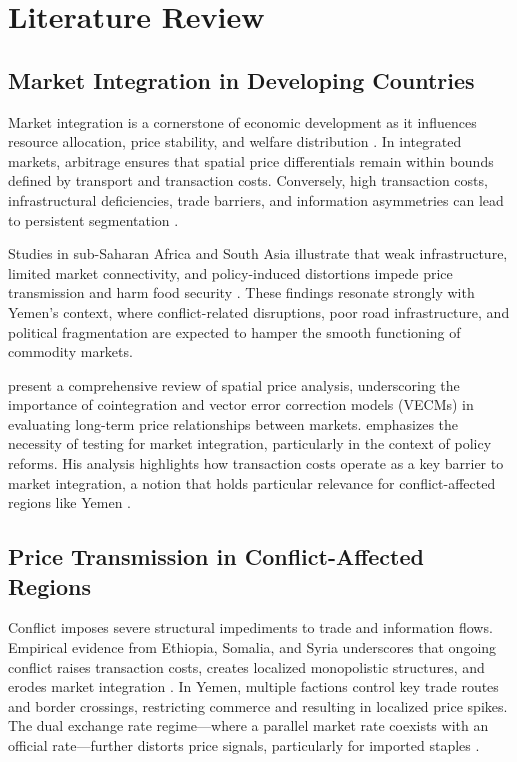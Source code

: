 \section{Literature Review}
\small  %
\setlength{\parskip}{0.3em}  %

\subsection{Market Integration in Developing Countries} 
Market integration is a cornerstone of economic development as it influences resource allocation, price stability, and welfare distribution \citep{fackler2001spatial, ravallion1986testing}. In integrated markets, arbitrage ensures that spatial price differentials remain within bounds defined by transport and transaction costs. Conversely, high transaction costs, infrastructural deficiencies, trade barriers, and information asymmetries can lead to persistent segmentation \citep{dercon1995market, baulch1997transfer}.

Studies in sub-Saharan Africa and South Asia illustrate that weak infrastructure, limited market connectivity, and policy-induced distortions impede price transmission and harm food security \citep{mcnew1996spatial, rashid2008spatial}. These findings resonate strongly with Yemen's context, where conflict-related disruptions, poor road infrastructure, and political fragmentation are expected to hamper the smooth functioning of commodity markets.

\citet{fackler2001spatial} present a comprehensive review of spatial price analysis, underscoring the importance of cointegration and vector error correction models (VECMs) in evaluating long-term price relationships between markets. \citet{ravallion1986testing} emphasizes the necessity of testing for market integration, particularly in the context of policy reforms. His analysis highlights how transaction costs operate as a key barrier to market integration, a notion that holds particular relevance for conflict-affected regions like Yemen \citep{mansour2021market}.

\subsection{Price Transmission in Conflict-Affected Regions} 
Conflict imposes severe structural impediments to trade and information flows. Empirical evidence from Ethiopia, Somalia, and Syria underscores that ongoing conflict raises transaction costs, creates localized monopolistic structures, and erodes market integration \citep{dercon1995market, little2007unofficial, mansour2021market}. In Yemen, multiple factions control key trade routes and border crossings, restricting commerce and resulting in localized price spikes. The dual exchange rate regime—where a parallel market rate coexists with an official rate—further distorts price signals, particularly for imported staples \citep{worldbank2022yemen}.

